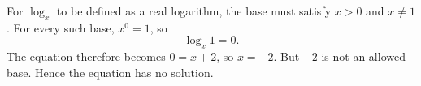 For $\log_x$ to be defined as a real logarithm, the base must satisfy $x>0$ and $x\ne1$. For every such base, $x^0=1$, so
\[\log_x 1=0 .\]
The equation therefore becomes $0=x+2$, so $x=-2$. But $-2$ is not an allowed base. Hence the equation has $\boxed{\text{no solution}}$.
